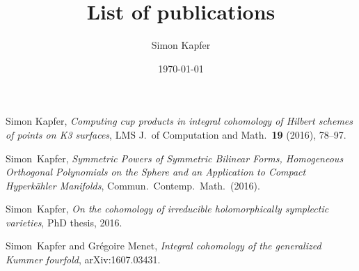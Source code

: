 \documentclass[11pt,a4paper,sans,english]{article}
\title{List of publications}
\author{Simon Kapfer}
\date{\today}
\begin{document}
\maketitle
\thispagestyle{plain}


\renewcommand{\section}[2]{}

\begin{thebibliography}{10}

Simon Kapfer, \emph{Computing cup products in integral cohomology of Hilbert schemes of points on K3 surfaces},
  LMS J.~of Computation and Math.~\textbf{19} (2016), 78--97.

Simon~Kapfer, \emph{Symmetric Powers of Symmetric Bilinear Forms, Homogeneous Orthogonal Polynomials 
  on the Sphere and an Application to Compact Hyperk\"ahler Manifolds}, Commun.~Contemp.~Math.~(2016).

Simon~Kapfer, \emph{On the cohomology of irreducible holomorphically symplectic varieties}, PhD thesis, 2016.

Simon~Kapfer and Gr\'egoire Menet, \emph{Integral cohomology of the generalized Kummer fourfold}, arXiv:1607.03431.

  
\end{thebibliography}
\end{document}
